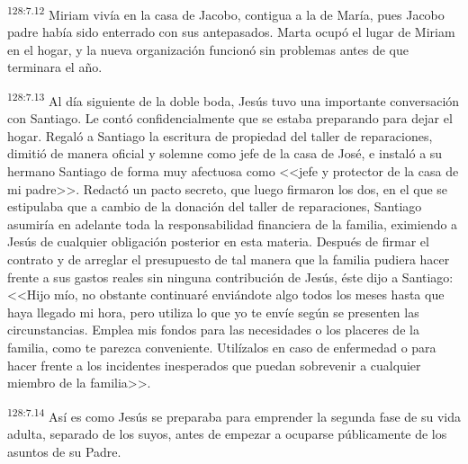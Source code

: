 \par 
\textsuperscript{128:7.12} Miriam vivía en la casa de Jacobo, contigua a la de María, pues Jacobo padre había sido enterrado con sus antepasados. Marta ocupó el lugar de Miriam en el hogar, y la nueva organización funcionó sin problemas antes de que terminara el año.

\par 
\textsuperscript{128:7.13} Al día siguiente de la doble boda, Jesús tuvo una importante conversación con Santiago. Le contó confidencialmente que se estaba preparando para dejar el hogar. Regaló a Santiago la escritura de propiedad del taller de reparaciones, dimitió de manera oficial y solemne como jefe de la casa de José, e instaló a su hermano Santiago de forma muy afectuosa como <<jefe y protector de la casa de mi padre>>. Redactó un pacto secreto, que luego firmaron los dos, en el que se estipulaba que a cambio de la donación del taller de reparaciones, Santiago asumiría en adelante toda la responsabilidad financiera de la familia, eximiendo a Jesús de cualquier obligación posterior en esta materia. Después de firmar el contrato y de arreglar el presupuesto de tal manera que la familia pudiera hacer frente a sus gastos reales sin ninguna contribución de Jesús, éste dijo a Santiago: <<Hijo mío, no obstante continuaré enviándote algo todos los meses hasta que haya llegado mi hora, pero utiliza lo que yo te envíe según se presenten las circunstancias. Emplea mis fondos para las necesidades o los placeres de la familia, como te parezca conveniente. Utilízalos en caso de enfermedad o para hacer frente a los incidentes inesperados que puedan sobrevenir a cualquier miembro de la familia>>.

\par 
\textsuperscript{128:7.14} Así es como Jesús se preparaba para emprender la segunda fase de su vida adulta, separado de los suyos, antes de empezar a ocuparse públicamente de los asuntos de su Padre.